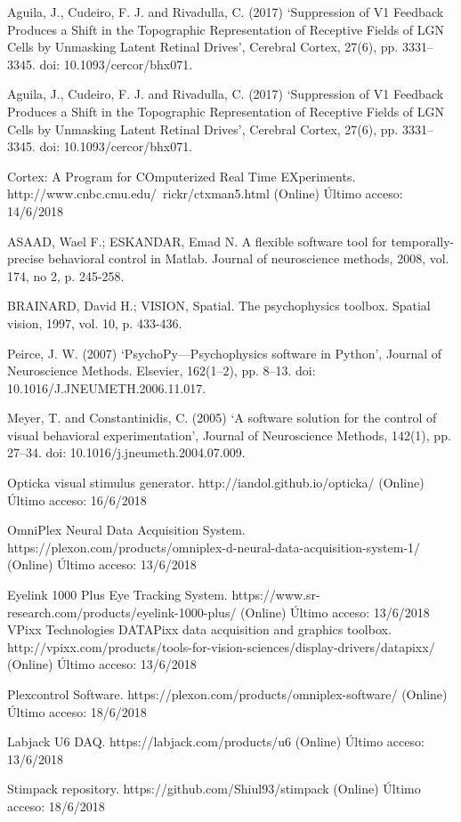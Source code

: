 \documentclass[conference]{IEEEtran}
\begin{document}
\begin{thebibliography}{00}
 Aguila, J., Cudeiro, F. J. and Rivadulla, C. (2017) ‘Suppression of V1 Feedback Produces a Shift in the Topographic Representation of Receptive Fields of LGN Cells by Unmasking Latent Retinal Drives’, Cerebral Cortex, 27(6), pp. 3331–3345. doi: 10.1093/cercor/bhx071.

 Aguila, J., Cudeiro, F. J. and Rivadulla, C. (2017) ‘Suppression of V1 Feedback Produces a Shift in the Topographic Representation of Receptive Fields of LGN Cells by Unmasking Latent Retinal Drives’, Cerebral Cortex, 27(6), pp. 3331–3345. doi: 10.1093/cercor/bhx071.

 Cortex: A Program for COmputerized Real Time EXperiments. http://www.cnbc.cmu.edu/~rickr/ctxman5.html (Online) Último acceso: 14/6/2018


ASAAD, Wael F.; ESKANDAR, Emad N. A flexible software tool for temporally-precise behavioral control in Matlab. Journal of neuroscience methods, 2008, vol. 174, no 2, p. 245-258.


 BRAINARD, David H.; VISION, Spatial. The psychophysics toolbox. Spatial vision, 1997, vol. 10, p. 433-436.

 Peirce, J. W. (2007) ‘PsychoPy—Psychophysics software in Python’, Journal of Neuroscience Methods. Elsevier, 162(1–2), pp. 8–13. doi: 10.1016/J.JNEUMETH.2006.11.017.

 Meyer, T. and Constantinidis, C. (2005) ‘A software solution for the control of visual behavioral experimentation’, Journal of Neuroscience Methods, 142(1), pp. 27–34. doi: 10.1016/j.jneumeth.2004.07.009.

 Opticka visual stimulus generator. http://iandol.github.io/opticka/ (Online) Último acceso: 16/6/2018


 OmniPlex Neural Data Acquisition System. https://plexon.com/products/omniplex-d-neural-data-acquisition-system-1/ (Online) Último acceso: 13/6/2018

 Eyelink 1000 Plus Eye Tracking System. https://www.sr-research.com/products/eyelink-1000-plus/ (Online) Último acceso: 13/6/2018
 VPixx Technologies DATAPixx data acquisition and graphics toolbox. http://vpixx.com/products/tools-for-vision-sciences/display-drivers/datapixx/  (Online) Último acceso: 13/6/2018

 Plexcontrol Software. https://plexon.com/products/omniplex-software/ (Online) Último acceso: 18/6/2018

 Labjack U6 DAQ. https://labjack.com/products/u6 (Online) Último acceso: 13/6/2018




 Stimpack repository. https://github.com/Shiul93/stimpack (Online) Último acceso: 18/6/2018

\end{thebibliography}

\vspace{12pt}
\end{document}
